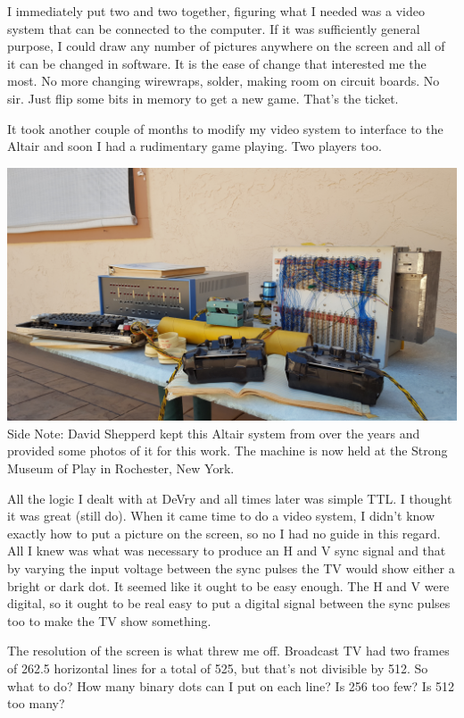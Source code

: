 I immediately put two and two together, figuring what I needed was a video system that can be connected to the computer. If it was sufficiently general purpose, I could draw any number of pictures anywhere on the screen and all of it can be changed in software. It is the ease of change that interested me the most. No more changing wirewraps, solder,  making room on circuit boards. No sir. Just flip some bits in memory to get a new game. That's the ticket.

It took another couple of months to modify my video system to interface to the Altair and soon I had a rudimentary game playing. Two players too.

\begin{tcolorbox}[]
    \includegraphics[width=\textwidth]{Pictures/05-ShepperdAltair01.jpg}
    Side Note: David Shepperd kept this Altair system from over the years and provided some photos of it for this work. The machine is now held at the Strong Museum of Play in Rochester, New York.
\end{tcolorbox}

All the logic I dealt with at DeVry and all times later was simple TTL. I thought it was great (still do). When it came time to do a video system, I didn't know exactly how to put a picture on the screen, so no I had no guide in this regard. All I knew was what was necessary to produce an H and V sync signal and that by varying the input voltage between the sync pulses the TV would show either a bright or dark dot. It seemed like it ought to be easy enough. The H and V were digital, so it ought to be real easy to put a digital signal between the sync pulses too to make the TV show something.

The resolution of the screen is what threw me off. Broadcast TV had two frames of 262.5 horizontal lines for a total of 525, but that's not divisible by 512. So what to do? How many binary dots can I put on each line? Is 256 too few? Is 512 too many? 

